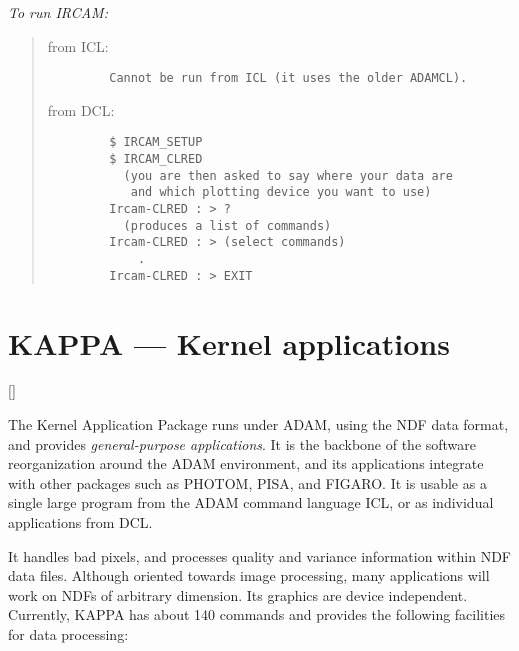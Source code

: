 {\em To run IRCAM:}\hfill
\begin{quote}
\begin{description}

\item [from ICL:]\hfill

\begin{small}
\begin{verbatim}
   Cannot be run from ICL (it uses the older ADAMCL).
\end{verbatim}
\end{small}

\item [from DCL:]\hfill

\begin{small}
\begin{verbatim}
   $ IRCAM_SETUP
   $ IRCAM_CLRED
     (you are then asked to say where your data are
      and which plotting device you want to use)
   Ircam-CLRED : > ?
     (produces a list of commands)
   Ircam-CLRED : > (select commands)
       .
   Ircam-CLRED : > EXIT
\end{verbatim}
\end{small}

\end{description}
\end{quote}

\newpage

\section{KAPPA --- Kernel applications} 

\vspace{-11mm}

\hfill []

\vspace{5mm}

The Kernel Application Package runs under ADAM, using the NDF data format, and
provides {\em general-purpose applications}.
It is the backbone of the software reorganization around the ADAM environment,
and its applications integrate with other packages such as PHOTOM, PISA, and
FIGARO.
It is usable as a single large program from the ADAM command language ICL, or
as individual applications from DCL.

It handles bad pixels, and processes quality and variance information within
NDF data files.
Although oriented towards image processing, many applications will work on
NDFs of arbitrary dimension.
Its graphics are device independent.
Currently, KAPPA has about 140 commands and provides the following facilities
for data processing:

